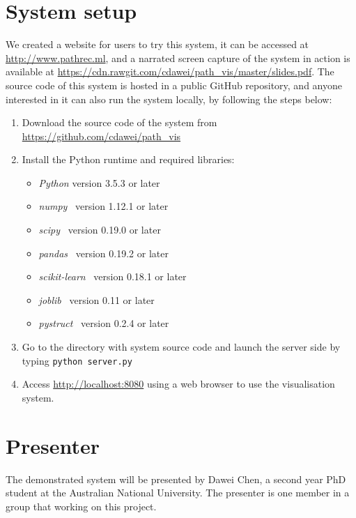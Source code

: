 \documentclass[sigconf]{acmart}
\begin{document}
\section{System setup}
\label{sec:setup}
We created a website for users to try this system, it can be accessed at 
\url{http://www.pathrec.ml},
and a narrated screen capture of the system in action is available at \url{https://cdn.rawgit.com/cdawei/path_vis/master/slides.pdf}.
The source code of this system is hosted in a public GitHub repository, 
and anyone interested in it can also run the system locally, by following the steps below:
\begin{enumerate}
\item Download the source code of the system from \url{https://github.com/cdawei/path_vis} 
\item Install the Python runtime and required libraries: 
      \begin{itemize}
      \item \textit{Python} version 3.5.3 or later
      \item \textit{numpy}~\cite{numpy} version 1.12.1 or later
      \item \textit{scipy}~\cite{scipy} version 0.19.0 or later
      \item \textit{pandas}~\cite{pandas} version 0.19.2 or later
      \item \textit{scikit-learn}~\cite{sklearn} version 0.18.1 or later
      \item \textit{joblib}~\cite{joblib} version 0.11 or later
      \item \textit{pystruct}~\cite{JMLR:v15:mueller14a} version 0.2.4 or later
      \end{itemize}
\item Go to the directory with system source code and launch the server side by typing \texttt{python server.py}
\item Access \url{http://localhost:8080} using a web browser to use the visualisation system.
\end{enumerate}


\section{Presenter}
\label{sec:presenter}
The demonstrated system will be presented by Dawei Chen, a second year PhD student at the Australian National University.
The presenter is one member in a group that working on this project.



 
\end{document}
